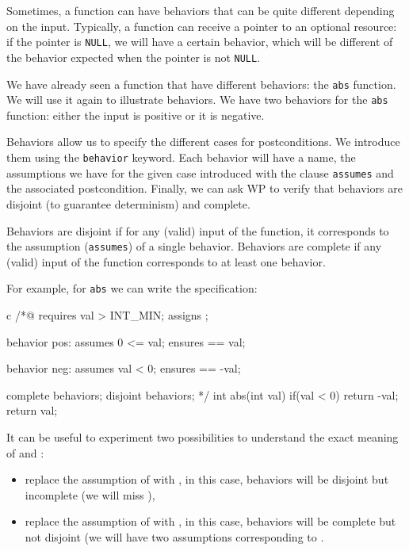 Sometimes, a function can have behaviors that can be quite different
depending on the input. Typically, a function can receive a pointer to
an optional resource: if the pointer is \texttt{NULL}, we will have a
certain behavior, which will be different of the behavior expected when
the pointer is not \texttt{NULL}.

We have already seen a function that have different behaviors: the
\texttt{abs} function. We will use it again to illustrate behaviors. We
have two behaviors for the \texttt{abs} function: either the input is
positive or it is negative.

Behaviors allow us to specify the different cases for postconditions. We
introduce them using the \texttt{behavior} keyword. Each behavior will
have a name, the assumptions we have for the given case introduced with
the clause \texttt{assumes} and the associated postcondition. Finally,
we can ask WP to verify that behaviors are disjoint (to guarantee
determinism) and complete.

Behaviors are disjoint if for any (valid) input of the function, it
corresponds to the assumption (\texttt{assumes}) of a single behavior.
Behaviors are complete if any (valid) input of the function corresponds
to at least one behavior.

For example, for \texttt{abs} we can write the specification:



\begin{CodeBlock}{c}
/*@
  requires val > INT_MIN;
  assigns  \nothing;

  behavior pos:
    assumes 0 <= val;
    ensures \result == val;
  
  behavior neg:
    assumes val < 0;
    ensures \result == -val;
 
  complete behaviors;
  disjoint behaviors;
*/
int abs(int val){
  if(val < 0) return -val;
  return val;
}
\end{CodeBlock}



It can be useful to experiment two possibilities to understand the exact
meaning of  and :

\begin{itemize}
\item
  replace the assumption of  with
  , in this case, behaviors will be
  disjoint but incomplete (we will miss ),
\item
  replace the assumption of  with
  , in this case, behaviors will be
  complete but not disjoint (we will have two assumptions corresponding
  to .
\end{itemize}


